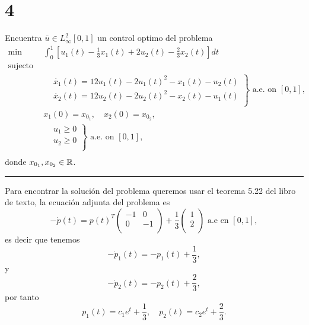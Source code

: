 \section*{4}

Encuentra $\bar{u} \in L^2_{\infty} [0, 1]$ un control optimo del problema
\begin{equation*}
\begin{aligned}
    \min \quad & \int^1_0 \left[ u_1(t) - \frac{1}{3}x_1(t) + 2 u_2(t) - \frac{2}{3} x_2(t) \right] dt \\
    \text{sujecto a} \\
        & \left.
        \begin{aligned}
            & \dot{x_1}(t) = 12 u_1(t) - 2 u_1(t)^2 - x_1(t) - u_2(t) \\
            & \dot{x_2}(t) = 12 u_2(t) - 2 u_2(t)^2 - x_2(t) - u_1(t) \\
        \end{aligned}
        \right\} \text{ a.e. on } [0,1], \\
        & x_1(0) = x_{0_1}, \quad x_2(0) = x_{0_2}, \\
        & \left.
        \begin{aligned}
            & u_1 \geq 0 \\
            & u_2 \geq 0 \\
        \end{aligned}
        \right\} \text{ a.e. on } [0,1], \\
\end{aligned}
\end{equation*}
donde $x_{0_1}, x_{0_2} \in \mathbb{R}$.

\noindent\rule{10cm}{0.4pt}

Para encontrar la solución del problema queremos usar el teorema 5.22 del libro de texto,
la ecuación adjunta del problema es
\begin{equation*}
    - \dot{p}(t) 
        = p(t)^{T} 
             \begin{pmatrix}
                 -1 & 0 \\
                 0 & -1 \\
             \end{pmatrix}
        + \frac{1}{3}
             \begin{pmatrix}
                 1 \\
                 2 \\
             \end{pmatrix} \text{ a.e en } [0, 1],
\end{equation*}
es decir que tenemos
\begin{equation*}
    - \dot{p}_1(t) = - p_1(t) + \frac{1}{3},
\end{equation*}
y
\begin{equation*}
    - \dot{p}_2(t) = - p_2(t) + \frac{2}{3},
\end{equation*}
por tanto
\begin{equation*}
    p_1(t) = c_1 e^t + \frac{1}{3}, \quad p_2(t) = c_2 e^t + \frac{2}{3}.
\end{equation*}

